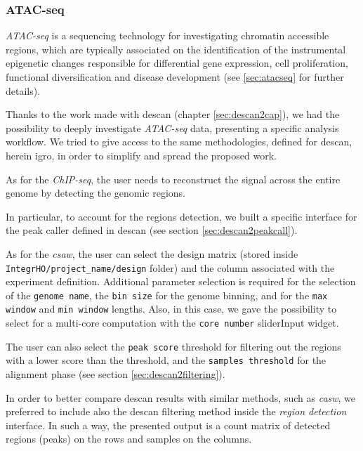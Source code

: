 \subsubsection{ATAC-seq} \label{sec:integrhoatac}

\textit{ATAC-seq} is a sequencing technology for investigating chromatin accessible regions, which are typically associated on the identification of the instrumental epigenetic changes responsible for differential gene expression, cell proliferation, functional diversification and disease development (see \ref{sec:atacseq} for further details).

Thanks to the work made with \gls{descan} (chapter \ref{sec:descan2cap}), we had the possibility to deeply investigate \textit{ATAC-seq} data, presenting a specific analysis workflow.
We tried to give access to the same methodologies, defined for \gls{descan}, herein \gls{igro}, in order to simplify and spread the proposed work.

As for the \textit{ChIP-seq}, the user needs to reconstruct the signal across the entire genome by detecting the genomic regions.

In particular, to account for the regions detection, we built a specific interface for the peak caller defined in \gls{descan} (see section \ref{sec:descan2peakcall}).

As for the \textit{csaw}, the user can select the design matrix (stored inside \lstinline!IntegrHO/project_name/design! folder) and the column associated with the experiment definition.
Additional parameter selection is required for the selection of the \lstinline!genome name!, the \lstinline!bin size! for the genome binning, and for the \lstinline!max window! and \lstinline!min window! lengths.
Also, in this case, we gave the possibility to select for a multi-core computation with the \lstinline!core number! sliderInput widget.

The user can also select the \lstinline!peak score! threshold for filtering out the regions with a lower score than the threshold, and the \lstinline!samples threshold! for the alignment phase (see section \ref{sec:descan2filtering}).

In order to better compare \gls{descan} results with similar methods, such as \textit{casw}, we preferred to include also the \gls{descan} filtering method inside the \textit{region detection} interface.
In such a way, the presented output is a count matrix of detected regions (peaks) on the rows and samples on the columns.

